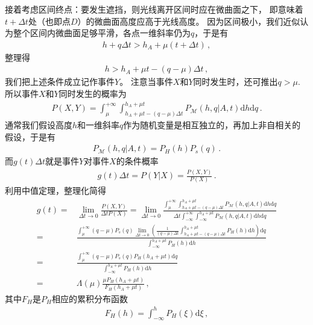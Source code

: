 接着考虑区间终点：要发生遮挡，则光线离开区间时应在微曲面之下，
即意味着$t+\Delta t$处（也即点$D$）的微曲面高度应高于光线高度。
因为区间极小，我们近似认为整个区间内微曲面足够平滑，各点一维斜率仍为$q$，于是有
\begin{align}
    h+q\Delta t>h_A+\mu(t+\Delta t)\, ,
\end{align}
整理得
\begin{align}
    h>h_A+\mu t-(q-\mu)\Delta t\, ,
\end{align}
我们把上述条件成立记作事件$Y$。
注意当事件$X$和$Y$同时发生时，还可推出$q>\mu$.
所以事件$X$和$Y$同时发生的概率为
\begin{align}
    P(X,Y)=\int_{\mu}^{+\infty}\int_{h_A+\mu t-(q-\mu)\Delta t}^{h_A+\mu t}
    P_{\mathcal{M}}(h,q|A,t)\mathrm{d}h\mathrm{d}q\, .
\end{align}
通常我们假设高度$h$和一维斜率$q$作为随机变量是相互独立的，再加上非自相关的假设，于是有
\begin{align}
    P_{\mathcal{M}}(h,q|A,t)=P_H(h)P_s(q)\, .
\end{align}
而$g(t)\Delta t$就是事件$Y$对事件$X$的条件概率
\begin{align}
    g(t)\Delta t=P(Y|X)=\frac{P(X,Y)}{P(X)}\, .
\end{align}
利用中值定理，整理化简得
\begin{align}\label{eq:08ex01-gt-expression}
    g(t)=&\lim\limits_{\Delta t\to 0}\frac{P(X,Y)}{\Delta tP(X)}
    =\lim\limits_{\Delta t\to 0}\frac{\displaystyle\int_{\mu}^{+\infty}\int_{h_A+\mu t-(q-\mu)\Delta t}^{h_A+\mu t}
    P_{\mathcal{M}}(h,q|A,t)\mathrm{d}h\mathrm{d}q}{\Delta t\displaystyle\int_{-\infty}^{+\infty}
    \int_{-\infty}^{h_A+\mu t}P_{\mathcal{M}}(h,q|A,t)\mathrm{d}h\mathrm{d}q}\nonumber\\
    =&\frac{\displaystyle\int_{\mu}^{+\infty}(q-\mu)P_s(q)\lim\limits_{\Delta t\to 0}
    \left(\frac{1}{(q-\mu)\Delta t}\int_{h_A+\mu t-(q-\mu)\Delta t}^{h_A+\mu t}P_H(h)\mathrm{d}h\right)\mathrm{d}q}
    {\displaystyle\int_{-\infty}^{h_A+\mu t}P_H(h)\mathrm{d}h}\nonumber\\
    =&\frac{\displaystyle\int_{\mu}^{+\infty}(q-\mu)P_s(q)P_H(h_A+\mu t)\mathrm{d}q}
    {\displaystyle\int_{-\infty}^{h_A+\mu t}P_H(h)\mathrm{d}h}\nonumber\\
    =&\Lambda(\mu)\frac{\mu P_H(h_A+\mu t)}{F_H(h_A+\mu t)}\, ,
\end{align}
其中$F_H$是$P_H$相应的累积分布函数
\begin{align}
    F_H(h)=\int_{-\infty}^{h}P_H(\xi)\mathrm{d}\xi\, ,
\end{align}
